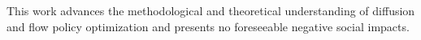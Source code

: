 This work advances the methodological and theoretical understanding of diffusion and flow policy optimization and presents no foreseeable negative social impacts.
